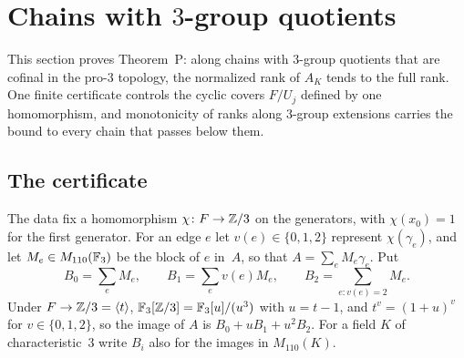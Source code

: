 \section{Chains with \texorpdfstring{$3$}{3}-group quotients}\label{sec:threechains}

This section proves Theorem~P: along chains with $3$-group quotients that are cofinal in the pro-$3$ topology, the
normalized rank of $A_K$ tends to the full rank. One finite certificate controls the cyclic covers $F/U_j$ defined by
one homomorphism, and monotonicity of ranks along $3$-group extensions carries the bound to every chain that passes below them.

\subsection{The certificate}\label{sec:certificate}

The data fix a homomorphism $\chi\colon F\to\mathbb{Z}/3$ on the generators, with $\chi(x_0)=1$ for the first generator. For an
edge $e$ let $v(e)\in\{0,1,2\}$ represent $\chi(\gamma_e)$, and let $M_e\in M_{110}(\mathbb{F}_3)$ be the block of $e$ in~$A$, so
that $A=\sum_eM_e\gamma_e$. Put
\[
  B_0=\sum_eM_e,\qquad B_1=\sum_ev(e)M_e,\qquad B_2=\sum_{e\colon v(e)=2}M_e.
\]
Under $F\to\mathbb{Z}/3=\langle t\rangle$, $\mathbb{F}_3[\mathbb{Z}/3]=\mathbb{F}_3[u]/(u^3)$ with $u=t-1$, and $t^v=(1+u)^v$ for $v\in\{0,1,2\}$, so the
image of $A$ is $B_0+uB_1+u^2B_2$. For a field $K$ of characteristic~$3$ write $B_i$ also for the images in $M_{110}(K)$.


